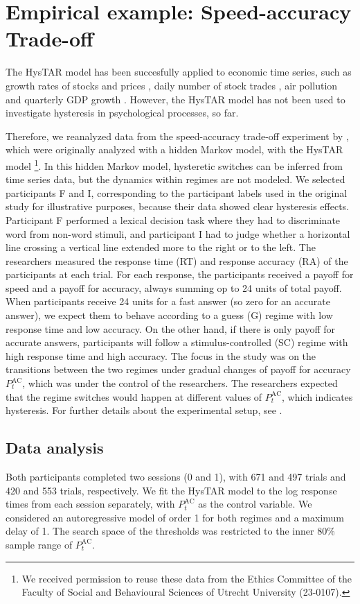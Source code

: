 \documentclass{article}
\begin{document}
\section{Empirical example: Speed-accuracy Trade-off} \label{sec:empirical_example_2}
The HysTAR model has been succesfully applied to economic time series, such as growth rates of stocks and prices \citep{tsay}, daily number of stock trades \citep{liu}, air pollution \citep{chen} and quarterly GDP growth \citep{bar2}. However, the HysTAR model has not been used to investigate hysteresis in psychological processes, so far.

Therefore, we reanalyzed data from the speed-accuracy trade-off experiment by \citet[][experiment 1b]{speedaccuracy}, which were originally analyzed with a hidden Markov model, with the HysTAR model \footnote{We received permission to reuse these data from the Ethics Committee of the Faculty of Social and Behavioural Sciences of Utrecht University (23-0107).}.
In this hidden Markov model, hysteretic switches can be inferred from time series data, but the dynamics within regimes are not modeled.
We selected participants F and I, corresponding to the participant labels used in the original study for illustrative purposes, because their data showed clear hysteresis effects.
Participant F performed a lexical decision task where they had to discriminate word from non-word stimuli, and participant I had to judge whether a horizontal line crossing a vertical line extended more to the right or to the left.
The researchers measured the response time (RT) and response accuracy (RA) of the participants at each trial.
For each response, the participants received a payoff for speed and a payoff for accuracy, always summing op to 24 units of total payoff.
When participants receive 24 units for a fast answer (so zero for an accurate answer), we expect them to behave according to a guess (G) regime with low response time and low accuracy.
On the other hand, if there is only payoff for accurate answers, participants will follow a stimulus-controlled (SC) regime with high response time and high accuracy.
The focus in the study was on the transitions between the two regimes under gradual changes of payoff for accuracy $P^{\mathrm{AC}}_t$, which was under the control of the researchers.
The researchers expected that the regime switches would happen at different values of $P^{\mathrm{AC}}_t$, which indicates hysteresis.
For further details about the experimental setup, see \citet{speedaccuracy}.

\subsection{Data analysis}
Both participants completed two sessions (0 and 1), with 671 and 497 trials and 420 and 553 trials, respectively.
We fit the HysTAR model to the log response times from each session separately, with $P^{\mathrm{AC}}_t$ as the control variable. 
We considered an autoregressive model of order 1 for both regimes and a maximum delay of 1.
The search space of the thresholds was restricted to the inner 80\% sample range of $P^{\mathrm{AC}}_t$.
\end{document}
